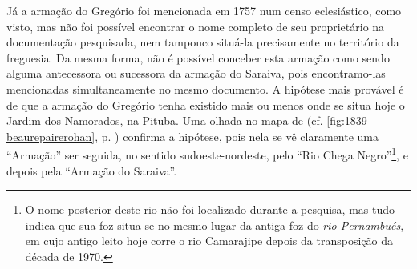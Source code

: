 Já a armação do Gregório foi mencionada em 1757 num censo eclesiástico, como visto, mas não foi possível encontrar o nome completo de seu proprietário na documentação pesquisada, nem tampouco situá-la precisamente no território da freguesia. Da mesma forma, não é possível conceber esta armação como sendo alguma antecessora ou sucessora da armação do Saraiva, pois encontramo-las mencionadas simultaneamente no mesmo documento. A hipótese mais provável é de que a armação do Gregório tenha existido mais ou menos onde se situa hoje o Jardim dos Namorados, na Pituba. Uma olhada no mapa de  (cf. \autoref{fig:1839-beaurepairerohan}, p. \pageref{fig:1839-beaurepairerohan}) confirma a hipótese, pois nela se vê claramente uma ``Armação'' ser seguida, no sentido sudoeste-nordeste, pelo ``Rio Chega Negro''\footnote{O nome posterior deste rio não foi localizado durante a pesquisa, mas tudo indica que sua foz situa-se no mesmo lugar da antiga foz do \textit{rio Pernambués}, em cujo antigo leito hoje corre o rio Camarajipe depois da transposição da década de 1970.}, e depois pela ``Armação do Saraiva''.



